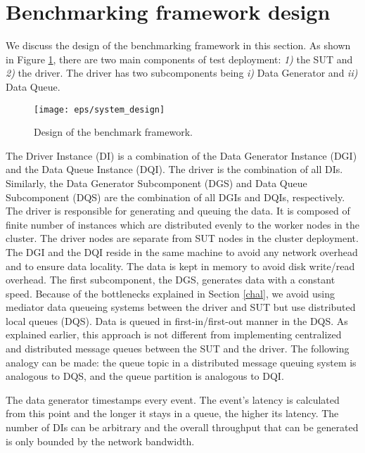 \section{Benchmarking framework design}
\label{des}
We discuss the design of the benchmarking framework in this section. As shown in Figure \ref{fig_design}, there are two main components of test deployment: \textit{1)} the SUT and \textit{2)} the driver. The driver has two subcomponents being \textit{i)} Data Generator and \textit{ii)} Data Queue.


\begin{figure}[h]
\centering
\texttt{[image: eps/system\_design]}
\caption{Design of the benchmark framework.}
\label{fig_design}
\end{figure}


The Driver Instance (DI) is a combination of the Data Generator Instance (DGI) and the Data Queue Instance (DQI). %
The driver is the combination of all DIs. Similarly, the Data Generator Subcomponent (DGS) and Data Queue Subcomponent (DQS) are the combination of all DGIs and DQIs, respectively. The driver is responsible for generating and queuing the data. It is composed of finite number of instances which are distributed evenly to the worker nodes in the cluster. The driver nodes are separate from SUT nodes in the cluster deployment. %
The DGI and the DQI reside in the same machine to avoid any network overhead and to ensure data locality. The data is kept in memory to avoid disk write/read overhead. The first subcomponent, the DGS, generates data with a constant speed. Because of the bottlenecks explained in Section \ref{chal}, we avoid using mediator data queueing systems between the driver and SUT but use distributed local queues (DQS). Data is queued in first-in/first-out manner in the DQS. As explained earlier, this approach is not different from implementing centralized and distributed message queues between the SUT and the driver. The following analogy can be made: the queue topic   in a distributed message queuing system is analogous to DQS, and the queue partition is analogous to DQI. 

The data generator  timestamps every event. The event's latency is calculated from this point and the longer it stays in a  queue, the higher its  latency. The number of DIs can be arbitrary and the overall throughput that can be generated is only bounded by the network bandwidth.%

